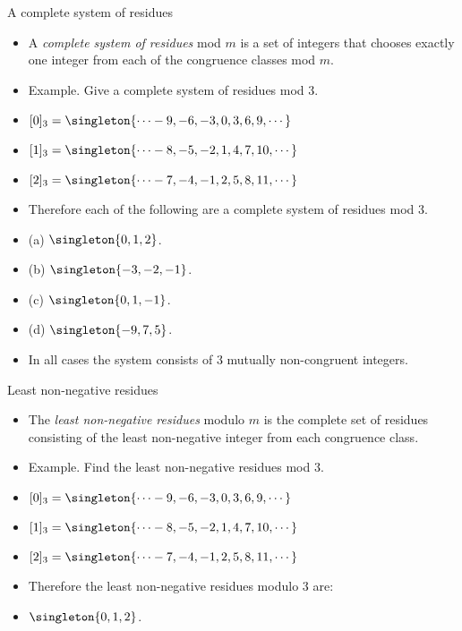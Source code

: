 \documentclass{beamer}
\begin{document}

\begin{frame}{A complete system of residues}

\begin{itemize}
  \item  A \emph{complete system of residues}  mod $m$ is a set of integers that
  chooses exactly one integer from each of the congruence classes mod $m$.
  \item Example. Give a complete system of residues mod $3$.
  \item $[0]_3 = \singleton{\cdots -9, -6, -3, 0, 3, 6, 9,\cdots}$
  \item $[1]_3 = \singleton{\cdots -8, -5, -2, 1, 4, 7, 10,\cdots}$
  \item $[2]_3 = \singleton{\cdots -7, -4, -1, 2, 5, 8, 11,\cdots}$
  \item Therefore each of the following are a complete system of residues mod 3.
  \item (a) $\singleton{0,1,2}$.
  \item (b) $\singleton{-3,-2,-1}$.
  \item (c) $\singleton{0,1,-1}$.
  \item (d) $\singleton{-9,7,5}$.
  \item In all cases the system consists of 3 mutually non-congruent integers.
\end{itemize}

\end{frame}

\begin{frame}{Least non-negative residues}

\begin{itemize}
  \item  The \emph{least non-negative residues} modulo $m$ is the complete set of residues
  consisting of the least non-negative integer from each congruence class.
  \item Example. Find the least non-negative residues mod $3$.
  \item $[0]_3 = \singleton{\cdots -9, -6, -3, 0, 3, 6, 9,\cdots}$
  \item $[1]_3 = \singleton{\cdots -8, -5, -2, 1, 4, 7, 10,\cdots}$
  \item $[2]_3 = \singleton{\cdots -7, -4, -1, 2, 5, 8, 11,\cdots}$
  \item Therefore the least non-negative residues modulo 3 are:
  \item $\singleton{0,1,2}$.
\end{itemize}

\end{frame}
\end{document}
